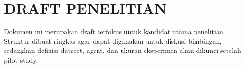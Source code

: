 \documentclass[proposal,satusetengahspasi,indonesia]{../cls/template-ta-2025}
\begin{document}
\titlepageind

\chapter*{DRAFT PENELITIAN}

Dokumen ini merupakan draft terfokus untuk kandidat utama penelitian. Struktur dibuat ringkas agar dapat digunakan untuk diskusi bimbingan, sedangkan definisi dataset, agent, dan ukuran eksperimen akan dikunci setelah pilot study.

\tableofcontents
\clearpage
{}



\end{document}
